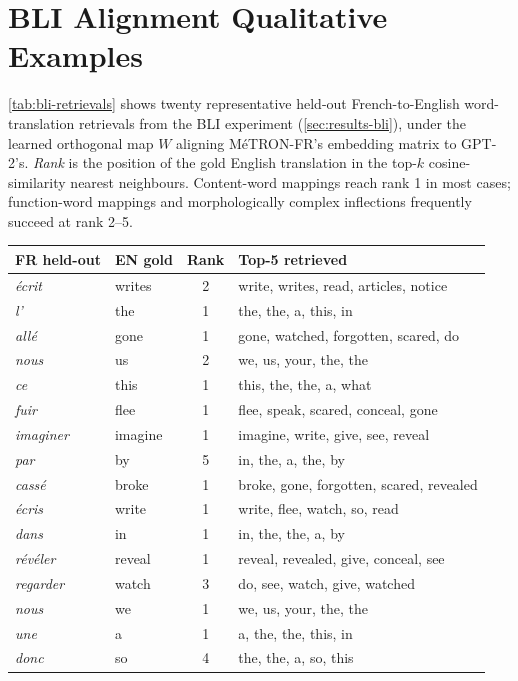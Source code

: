 \documentclass[11pt]{article}
\begin{document}
\section{BLI Alignment Qualitative Examples}
\label{app:bli}

\autoref{tab:bli-retrievals} shows twenty representative held-out French-to-English word-translation retrievals from the BLI experiment (\autoref{sec:results-bli}), under the learned orthogonal map $W$ aligning MéTRON-FR's embedding matrix to GPT-2's. \emph{Rank} is the position of the gold English translation in the top-$k$ cosine-similarity nearest neighbours. Content-word mappings reach rank 1 in most cases; function-word mappings and morphologically complex inflections frequently succeed at rank 2--5.

\begin{table}[h]
\centering
\begin{tabular}{l l c p{10cm}}
\toprule
FR held-out & EN gold & Rank & Top-5 retrieved \\
\midrule
\emph{écrit} & writes & 2 & write, writes, read, articles, notice \\
\emph{l'} & the & 1 & the, the, a, this, in \\
\emph{allé} & gone & 1 & gone, watched, forgotten, scared, do \\
\emph{nous} & us & 2 & we, us, your, the, the \\
\emph{ce} & this & 1 & this, the, the, a, what \\
\emph{fuir} & flee & 1 & flee, speak, scared, conceal, gone \\
\emph{imaginer} & imagine & 1 & imagine, write, give, see, reveal \\
\emph{par} & by & 5 & in, the, a, the, by \\
\emph{cassé} & broke & 1 & broke, gone, forgotten, scared, revealed \\
\emph{écris} & write & 1 & write, flee, watch, so, read \\
\emph{dans} & in & 1 & in, the, the, a, by \\
\emph{révéler} & reveal & 1 & reveal, revealed, give, conceal, see \\
\emph{regarder} & watch & 3 & do, see, watch, give, watched \\
\emph{nous} & we & 1 & we, us, your, the, the \\
\emph{une} & a & 1 & a, the, the, this, in \\
\emph{donc} & so & 4 & the, the, a, so, this \\

\end{tabular}
\end{table}
\end{document}
